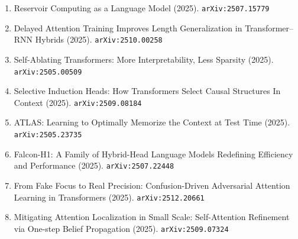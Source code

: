 \documentclass[11pt]{article}
\begin{document}
\begin{enumerate}
  \item Reservoir Computing as a Language Model (2025). \texttt{arXiv:2507.15779}
  \item Delayed Attention Training Improves Length Generalization in Transformer--RNN Hybrids (2025). \texttt{arXiv:2510.00258}
  \item Self-Ablating Transformers: More Interpretability, Less Sparsity (2025). \texttt{arXiv:2505.00509}
  \item Selective Induction Heads: How Transformers Select Causal Structures In Context (2025). \texttt{arXiv:2509.08184}
  \item ATLAS: Learning to Optimally Memorize the Context at Test Time (2025). \texttt{arXiv:2505.23735}
  \item Falcon-H1: A Family of Hybrid-Head Language Models Redefining Efficiency and Performance (2025). \texttt{arXiv:2507.22448}
  \item From Fake Focus to Real Precision: Confusion-Driven Adversarial Attention Learning in Transformers (2025). \texttt{arXiv:2512.20661}
  \item Mitigating Attention Localization in Small Scale: Self-Attention Refinement via One-step Belief Propagation (2025). \texttt{arXiv:2509.07324}
\end{enumerate}
\end{document}
